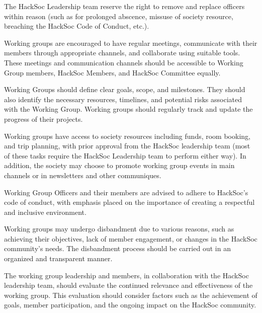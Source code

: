 \begin{subclause}
    The HackSoc Leadership team reserve the right to remove and replace officers within reason (such as for prolonged abscence, missuse of society resource, breaching the HackSoc Code of Conduct, etc.).
\end{subclause}

\begin{subclause}
Working groups are encouraged to have regular meetings, communicate with their members through appropriate channels, and collaborate using suitable tools. These meetings and communication channels should be accessible to Working Group members, HackSoc Members, and HackSoc Committee equally.
\end{subclause}

\begin{subclause}
Working Groups should define clear goals, scope, and milestones. They should also identify the necessary resources, timelines, and potential risks associated with the Working Group. Working groups should regularly track and update the progress of their projects.
\end{subclause}

\begin{subclause}
Working groups have access to society resources including funds, room booking, and trip planning, with prior approval from the HackSoc leadership team (most of these tasks require the HackSoc Leadership team to perform either way). In addition, the society may choose to promote working group events in main channels or in newsletters and other communiques.
\end{subclause}

\begin{subclause}
Working Group Officers and their members are advised to adhere to HackSoc's code of conduct, with emphasis placed on the importance of creating a respectful and inclusive environment.
\end{subclause}

\begin{clause}
Working groups may undergo disbandment due to various reasons, such as achieving their objectives, lack of member engagement, or changes in the HackSoc community's needs. The disbandment process should be carried out in an organized and transparent manner.
\end{clause}

\begin{subclause}
The working group leadership and members, in collaboration with the HackSoc leadership team, should evaluate the continued relevance and effectiveness of the working group. This evaluation should consider factors such as the achievement of goals, member participation, and the ongoing impact on the HackSoc community.
\end{subclause}

